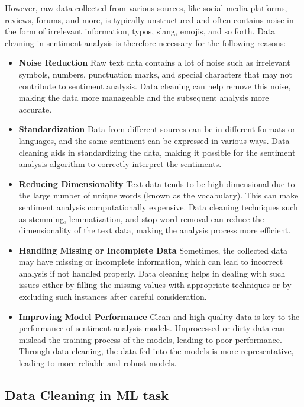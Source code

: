 \documentclass{article}
\begin{document}
However, raw data collected from various sources, like social media platforms, reviews, forums, and more, is typically unstructured and often contains noise in the form of irrelevant information, typos, slang, emojis, and so forth. Data cleaning in sentiment analysis is therefore necessary for the following reasons:

\begin{itemize}
    \item \textbf{Noise Reduction}
Raw text data contains a lot of noise such as irrelevant symbols, numbers, punctuation marks, and special characters that may not contribute to sentiment analysis. Data cleaning can help remove this noise, making the data more manageable and the subsequent analysis more accurate.

\item \textbf{Standardization}
Data from different sources can be in different formats or languages, and the same sentiment can be expressed in various ways. Data cleaning aids in standardizing the data, making it possible for the sentiment analysis algorithm to correctly interpret the sentiments.
\item  \textbf{Reducing Dimensionality}
Text data tends to be high-dimensional due to the large number of unique words (known as the vocabulary). This can make sentiment analysis computationally expensive. Data cleaning techniques such as stemming, lemmatization, and stop-word removal can reduce the dimensionality of the text data, making the analysis process more efficient.

\item  \textbf{Handling Missing or Incomplete Data}
Sometimes, the collected data may have missing or incomplete information, which can lead to incorrect analysis if not handled properly. Data cleaning helps in dealing with such issues either by filling the missing values with appropriate techniques or by excluding such instances after careful consideration.

\item \textbf{Improving Model Performance}
Clean and high-quality data is key to the performance of sentiment analysis models. Unprocessed or dirty data can mislead the training process of the models, leading to poor performance. Through data cleaning, the data fed into the models is more representative, leading to more reliable and robust models.
\end{itemize}

\subsection{Data Cleaning in ML task}
\end{document}
